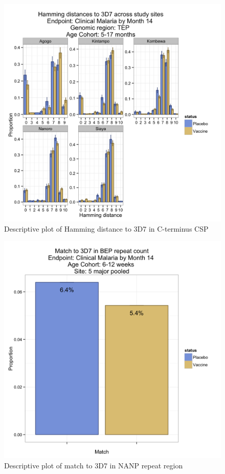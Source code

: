 \documentclass[]{article}
\begin{document}
\begin{figure}[htbp]
\centering
\includegraphics{figures/hamming-infant-sites-c-1.png}
\caption{Descriptive plot of Hamming distance to 3D7 in C-terminus CSP}
\end{figure}

\begin{figure}[htbp]
\centering
\includegraphics{figures/bep-match-newborn-c-1.png}
\caption{Descriptive plot of match to 3D7 in NANP repeat region}
\end{figure}
\end{document}
